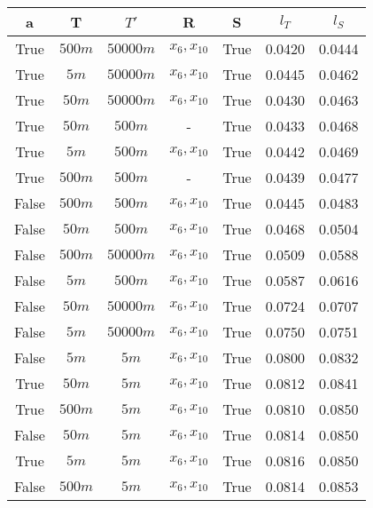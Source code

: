 \begin{tabular}{| c c c | c c | c c |}
\hline
a & T & $T'$ & R & S & $l_T$ & $l_S$ \\
\hline
True & $500m$ & $50000m$ & $x_{6}, x_{10}$ & True & 0.0420 & 0.0444 \\
True & $5m$ & $50000m$ & $x_{6}, x_{10}$ & True & 0.0445 & 0.0462 \\
True & $50m$ & $50000m$ & $x_{6}, x_{10}$ & True & 0.0430 & 0.0463 \\
True & $50m$ & $500m$ & - & True & 0.0433 & 0.0468 \\
True & $5m$ & $500m$ & $x_{6}, x_{10}$ & True & 0.0442 & 0.0469 \\
True & $500m$ & $500m$ & - & True & 0.0439 & 0.0477 \\
False & $500m$ & $500m$ & $x_{6}, x_{10}$ & True & 0.0445 & 0.0483 \\
False & $50m$ & $500m$ & $x_{6}, x_{10}$ & True & 0.0468 & 0.0504 \\
False & $500m$ & $50000m$ & $x_{6}, x_{10}$ & True & 0.0509 & 0.0588 \\
False & $5m$ & $500m$ & $x_{6}, x_{10}$ & True & 0.0587 & 0.0616 \\
False & $50m$ & $50000m$ & $x_{6}, x_{10}$ & True & 0.0724 & 0.0707 \\
False & $5m$ & $50000m$ & $x_{6}, x_{10}$ & True & 0.0750 & 0.0751 \\
False & $5m$ & $5m$ & $x_{6}, x_{10}$ & True & 0.0800 & 0.0832 \\
True & $50m$ & $5m$ & $x_{6}, x_{10}$ & True & 0.0812 & 0.0841 \\
True & $500m$ & $5m$ & $x_{6}, x_{10}$ & True & 0.0810 & 0.0850 \\
False & $50m$ & $5m$ & $x_{6}, x_{10}$ & True & 0.0814 & 0.0850 \\
True & $5m$ & $5m$ & $x_{6}, x_{10}$ & True & 0.0816 & 0.0850 \\
False & $500m$ & $5m$ & $x_{6}, x_{10}$ & True & 0.0814 & 0.0853 \\
\hline
\end{tabular}
